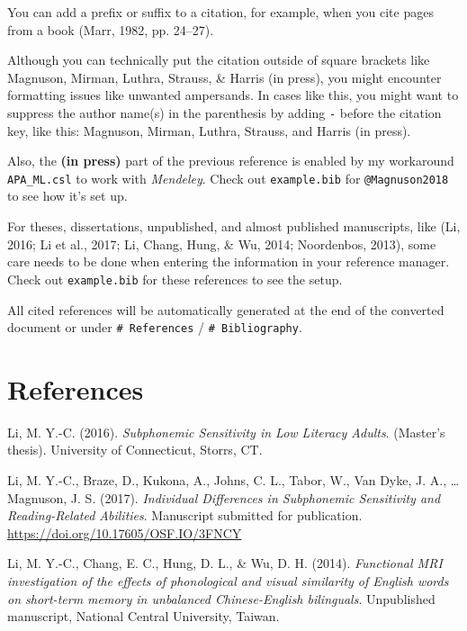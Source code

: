 \documentclass[english,floatsintext,man]{apa6}
\newcounter{author}
\theoremstyle{definition}
\theoremstyle{definition}
\theoremstyle{remark}
\begin{document}
You can add a prefix or suffix to a citation, for example, when you cite
pages from a book (Marr, 1982, pp. 24--27).

Although you can technically put the citation outside of square brackets
like Magnuson, Mirman, Luthra, Strauss, \& Harris (in press), you might
encounter formatting issues like unwanted ampersands. In cases like
this, you might want to suppress the author name(s) in the parenthesis
by adding \texttt{-} before the citation key, like this: Magnuson,
Mirman, Luthra, Strauss, and Harris (in press).

Also, the \textbf{(in press)} part of the previous reference is enabled
by my workaround \texttt{APA\_ML.csl} to work with \emph{Mendeley}.
Check out \texttt{example.bib} for \texttt{@Magnuson2018} to see how
it's set up.

For theses, dissertations, unpublished, and almost published
manuscripts, like (Li, 2016; Li et al., 2017; Li, Chang, Hung, \& Wu,
2014; Noordenbos, 2013), some care needs to be done when entering the
information in your reference manager. Check out \texttt{example.bib}
for these references to see the setup.

All cited references will be automatically generated at the end of the
converted document or under \texttt{\#\ References} /
\texttt{\#\ Bibliography}.

\section*{References}\label{references}

\hypertarget{refs}{}
\hypertarget{ref-Li2016}{}
Li, M. Y.-C. (2016). \emph{Subphonemic Sensitivity in Low Literacy
Adults}. (Master's thesis). University of Connecticut, Storrs, CT.

\hypertarget{ref-Li2017}{}
Li, M. Y.-C., Braze, D., Kukona, A., Johns, C. L., Tabor, W., Van Dyke,
J. A., \ldots{} Magnuson, J. S. (2017). \emph{Individual Differences in
Subphonemic Sensitivity and Reading-Related Abilities}. Manuscript
submitted for publication. \url{https://doi.org/10.17605/OSF.IO/3FNCY}

\hypertarget{ref-Li2014}{}
Li, M. Y.-C., Chang, E. C., Hung, D. L., \& Wu, D. H. (2014).
\emph{Functional MRI investigation of the effects of phonological and
visual similarity of English words on short-term memory in unbalanced
Chinese-English bilinguals}. Unpublished manuscript, National Central
University, Taiwan.
\end{document}
